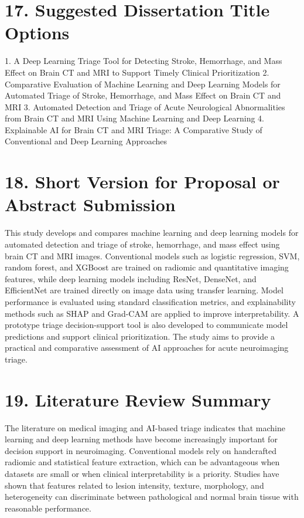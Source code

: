 \documentclass[12pt,a4paper]{report}
\begin{document}
\section{17. Suggested Dissertation Title Options}

1. A Deep Learning Triage Tool for Detecting Stroke, Hemorrhage, and Mass Effect on Brain CT and MRI to Support Timely Clinical Prioritization
2. Comparative Evaluation of Machine Learning and Deep Learning Models for Automated Triage of Stroke, Hemorrhage, and Mass Effect on Brain CT and MRI
3. Automated Detection and Triage of Acute Neurological Abnormalities from Brain CT and MRI Using Machine Learning and Deep Learning
4. Explainable AI for Brain CT and MRI Triage: A Comparative Study of Conventional and Deep Learning Approaches


\section{18. Short Version for Proposal or Abstract Submission}

This study develops and compares machine learning and deep learning models for automated detection and triage of stroke, hemorrhage, and mass effect using brain CT and MRI images. Conventional models such as logistic regression, SVM, random forest, and XGBoost are trained on radiomic and quantitative imaging features, while deep learning models including ResNet, DenseNet, and EfficientNet are trained directly on image data using transfer learning. Model performance is evaluated using standard classification metrics, and explainability methods such as SHAP and Grad-CAM are applied to improve interpretability. A prototype triage decision-support tool is also developed to communicate model predictions and support clinical prioritization. The study aims to provide a practical and comparative assessment of AI approaches for acute neuroimaging triage.


\section{19. Literature Review Summary}

The literature on medical imaging and AI-based triage indicates that machine learning and deep learning methods have become increasingly important for decision support in neuroimaging. Conventional models rely on handcrafted radiomic and statistical feature extraction, which can be advantageous when datasets are small or when clinical interpretability is a priority. Studies have shown that features related to lesion intensity, texture, morphology, and heterogeneity can discriminate between pathological and normal brain tissue with reasonable performance.
\end{document}
